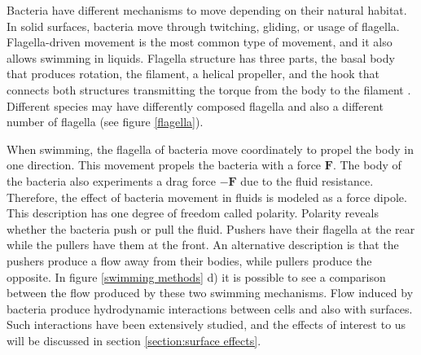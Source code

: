 Bacteria have different mechanisms to move depending on their natural habitat. In solid surfaces, bacteria move through twitching, gliding, or usage of flagella. Flagella-driven movement is the most common type of movement, and it also allows swimming in liquids. Flagella structure has three parts, the basal body that produces rotation, the filament, a helical propeller, and the hook that connects both structures transmitting the torque from the body to the filament \cite{Nakamura2019Flagella-drivenBacteria}. Different species may have differently composed flagella and also a different number of flagella (see figure \ref{flagella}). 





When swimming, the flagella of bacteria move coordinately to propel the body in one direction. This movement propels the bacteria with a force $\textbf{F}$. The body of the bacteria also experiments a drag force $-\textbf{F}$ due to the fluid resistance. Therefore, the effect of bacteria movement in fluids is modeled as a force dipole. This description has one degree of freedom called polarity. Polarity reveals whether the bacteria push or pull the fluid. Pushers have their flagella at the rear while the pullers have them at the front. An alternative description is that the pushers produce a flow away from their bodies, while pullers produce the opposite. In figure \ref{swimming methods} d) it is possible to see a comparison between the flow produced by these two swimming mechanisms. Flow induced by bacteria produce hydrodynamic interactions between cells and also with surfaces. Such interactions have been extensively studied, and the effects of interest to us will be discussed in section \ref{section:surface effects}. 


